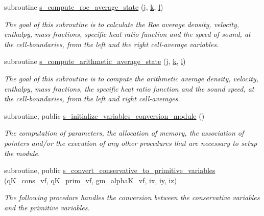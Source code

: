 \begin{DoxyCompactItemize}
subroutine \hyperlink{namespacem__variables__conversion_a4cf9b21c0dfd924ac807585579240486}{s\+\_\+compute\+\_\+roe\+\_\+average\+\_\+state} (\hyperlink{m__rhs_8f90_aeadbc0ce9b66517f8fde156199772ec1}{j}, \hyperlink{m__rhs_8f90_af22c486581933c52df7d4aa306382074}{k}, \hyperlink{m__rhs_8f90_a2ac747380de0e6e5e11b01f4137fb75c}{l})
\begin{DoxyCompactList}\small\item\em The goal of this subroutine is to calculate the Roe average density, velocity, enthalpy, mass fractions, specific heat ratio function and the speed of sound, at the cell-\/boundaries, from the left and the right cell-\/average variables. \end{DoxyCompactList}\item 
subroutine \hyperlink{namespacem__variables__conversion_a825db8aee0af3c120a7ca1f8de814490}{s\+\_\+compute\+\_\+arithmetic\+\_\+average\+\_\+state} (\hyperlink{m__rhs_8f90_aeadbc0ce9b66517f8fde156199772ec1}{j}, \hyperlink{m__rhs_8f90_af22c486581933c52df7d4aa306382074}{k}, \hyperlink{m__rhs_8f90_a2ac747380de0e6e5e11b01f4137fb75c}{l})
\begin{DoxyCompactList}\small\item\em The goal of this subroutine is to compute the arithmetic average density, velocity, enthalpy, mass fractions, the specific heat ratio function and the sound speed, at the cell-\/boundaries, from the left and right cell-\/averages. \end{DoxyCompactList}\item 
subroutine, public \hyperlink{namespacem__variables__conversion_ac006af9a5403b2fdad7f81ce0a67ecec}{s\+\_\+initialize\+\_\+variables\+\_\+conversion\+\_\+module} ()
\begin{DoxyCompactList}\small\item\em The computation of parameters, the allocation of memory, the association of pointers and/or the execution of any other procedures that are necessary to setup the module. \end{DoxyCompactList}\item 
subroutine, public \hyperlink{namespacem__variables__conversion_a4b22f555477e0d617f5cf53fd4e2fa38}{s\+\_\+convert\+\_\+conservative\+\_\+to\+\_\+primitive\+\_\+variables} (q\+K\+\_\+cons\+\_\+vf, q\+K\+\_\+prim\+\_\+vf, gm\+\_\+alpha\+K\+\_\+vf, ix, iy, iz)
\begin{DoxyCompactList}\small\item\em The following procedure handles the conversion between the conservative variables and the primitive variables. \end{DoxyCompactList}\item 

\end{DoxyCompactItemize}
